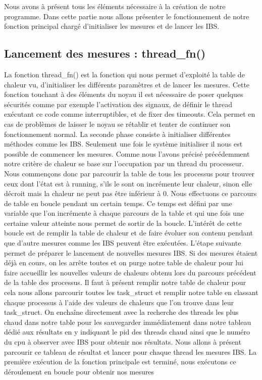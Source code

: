    Nous avons à présent tous les éléments nécessaire à la création de notre
    programme. Dans cette partie nous allons présenter le fonctionnement de
    notre fonction principal chargé d'initialiser les mesures et de lancer les
    IBS.

    \subsection{Lancement des mesures : thread\_fn()}

      La fonction thread\_fn() est la fonction qui nous permet d'exploité la
      table de chaleur vu, d'initialiser les différents paramètres et de lancer
      les mesures.  Cette fonction touchant à des éléments du noyau il est
      nécessaire de poser quelques sécurités comme par exemple l'activation des
      signaux, de définir le thread exécutant ce code comme interruptibles, et
      de fixer des timeouts. Cela permet en cas de problèmes de laisser le noyau
      se rétablir et tenter de continuer son fonctionnement normal.  La seconde
      phase consiste à initialiser différentes méthodes comme les IBS.
      Seulement une fois le système initialiser il nous est possible de
      commencer les mesures.  Comme nous l'avons précisé précédemment notre
      critère de chaleur se base sur l'occupation par un thread du
      processeur. Nous commençons donc par parcourir la table de tous les
      processus pour trouver ceux dont l'état est à running, s'ils le sont on
      incrémente leur chaleur, sinon elle décroit mais la chaleur ne peut pas
      être inférieur à 0.  Nous effectuons ce parcours de table en boucle
      pendant un certain temps. Ce temps est défini par une variable que l'on
      incrémente à chaque parcours de la table et qui une fois une certaine
      valeur atteinte nous permet de sortir de la boucle. L’intérêt de cette
      boucle est de remplir la table de chaleur et de faire évoluer son contenu
      pendant que d'autre mesures comme les IBS peuvent être exécutées.  L'étape
      suivante permet de préparer le lancement de nouvelles mesures IBS. Si des
      mesures étaient déjà en cours, on les arrête toutes et on purge notre
      table de chaleur pour lui faire accueillir les nouvelles valeurs de
      chaleurs obtenu lors du parcours précédent de la table des processus.  Il
      faut à présent remplir notre table de chaleur pour cela nous allons
      parcourir toutes les task\_struct et remplir notre table en classant
      chaque processus à l'aide des valeurs de chaleurs que l'on trouve dans
      leur task\_struct. On enchaîne directement avec la recherche des threads
      les plus chaud dans notre table pour les sauvegarder immédiatement dans
      notre tableau dédié aux résultats en y indiquant le pid des threads chaud
      ainsi que le numéro du cpu à observer avec IBS pour obtenir nos résultats.
      Nous allons à présent parcourir ce tableau de résultat et lancer pour
      chaque thread les mesures IBS.  La première exécution de la fonction
      principale est terminé, nous exécutons ce déroulement en boucle pour
      obtenir nos mesures
